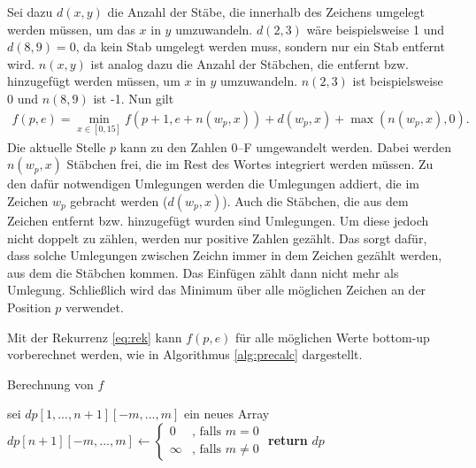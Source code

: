 \documentclass[a4paper,10pt,ngerman]{scrartcl}
\begin{document}
Sei dazu $d(x,y)$ die Anzahl der Stäbe, die innerhalb des Zeichens umgelegt werden müssen, um das $x$ in $y$ umzuwandeln. $d(2, 3)$ wäre beispielsweise 1 und $d(8,9) = 0$, da kein Stab umgelegt werden muss, sondern nur ein Stab entfernt wird.   
$n(x, y)$ ist analog dazu die Anzahl der Stäbchen, die entfernt bzw. hinzugefügt werden müssen, um $x$ in $y$ umzuwandeln.  $n(2, 3)$ ist beispielsweise 0 und $n(8,9)$ ist -1.
Nun gilt
\begin{align}
    f(p, e) = \min_{x\in [0, 15]} f(p + 1, e + n(w_p, x)) + d(w_p, x) + \max(n(w_p, x), 0). \label{eq:rek}
\end{align}
Die aktuelle Stelle $p$ kann zu den Zahlen 0–F umgewandelt werden. Dabei werden $n(w_p, x)$ Stäbchen frei, die im Rest des Wortes integriert werden müssen. Zu den dafür notwendigen Umlegungen werden die Umlegungen addiert, die im Zeichen $w_p$ gebracht werden ($d(w_p, x)$). 
Auch die Stäbchen, die aus dem Zeichen entfernt bzw. hinzugefügt wurden sind Umlegungen. Um diese jedoch nicht doppelt zu zählen, werden nur positive Zahlen gezählt. 
Das sorgt dafür, dass solche Umlegungen zwischen Zeichn immer in dem Zeichen gezählt werden, aus dem die Stäbchen kommen. Das Einfügen zählt dann nicht mehr als Umlegung. 
Schließlich wird das Minimum über alle möglichen Zeichen an der Position $p$ verwendet. 
 
Mit der Rekurrenz \ref{eq:rek} kann $f(p, e)$ für alle möglichen Werte bottom-up vorberechnet werden, wie in Algorithmus \ref{alg:precalc} dargestellt.
\begin{algorithm}
\caption{Berechnung von $f$}
\label{alg:precalc}
\begin{algorithmic}[1]
    \State sei $dp[1, ..., n+1][-m, ..., m]$ ein neues Array
    \State $dp[n+1][-m, ..., m] \gets \begin{cases}
        0 & \text{, falls } m = 0\\
        \infty &\text{, falls } m \neq 0
    \end{cases}$ 
        \EndFor 
    \EndFor
    \State \textbf{return} $dp$
\EndProcedure
\end{algorithmic}
\end{algorithm} 
\end{document}
